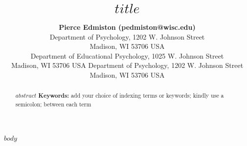 \documentclass[10pt,letterpaper]{article}
\title{$title$}
\author{{\large \bf Pierce Edmiston (pedmiston@wisc.edu)} \\
  Department of Psychology, 1202 W. Johnson Street \\
  Madison, WI 53706 USA
  \AND {\large \bf Marcus Perlman} \\
  Department of Educational Psychology, 1025 W. Johnson Street \\
  Madison, WI 53706 USA
  \AND {\large \bf Gary Lupyan}
  Department of Psychology, 1202 W. Johnson Street \\
  Madison, WI 53706 USA}
\begin{document}
\maketitle


\begin{abstract}
$abstract$
\textbf{Keywords:}
add your choice of indexing terms or keywords; kindly use a
semicolon; between each term
\end{abstract}

$body$



\end{document}
